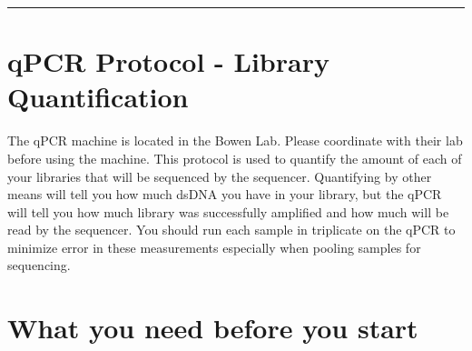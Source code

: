 \documentclass[
  letterpaper,
  DIV=11,
  numbers=noendperiod]{scrreprt}
\begin{document}
\begin{center}\rule{0.5\linewidth}{0.5pt}\end{center}

\hypertarget{qpcr-protocol---library-quantification}{%
\section*{\texorpdfstring{\textbf{qPCR Protocol - Library
Quantification}}{qPCR Protocol - Library Quantification}}\label{qpcr-protocol---library-quantification}}


The qPCR machine is located in the Bowen Lab. Please coordinate with
their lab before using the machine. This protocol is used to quantify
the amount of each of your libraries that will be sequenced by the
sequencer. Quantifying by other means will tell you how much dsDNA you
have in your library, but the qPCR will tell you how much library was
successfully amplified and how much will be read by the sequencer. You
should run each sample in triplicate on the qPCR to minimize error in
these measurements especially when pooling samples for sequencing.

\hypertarget{what-you-need-before-you-start}{%
\section*{\texorpdfstring{\textbf{What you need before you
start}}{What you need before you start}}\label{what-you-need-before-you-start}}

\end{document}
